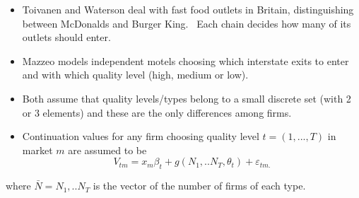 \begin{frame}%


\begin{itemize}
\item Toivanen and Waterson deal with fast food outlets in Britain,
distinguishing between McDonalds and Burger King. \ Each chain decides how
many of its outlets should enter.

\item Mazzeo models independent motels choosing which interstate exits to
enter and with which quality level (high, medium or low).

\item Both assume that quality levels/types belong to a small discrete set
(with 2 or 3 elements) and these are the only differences among firms.

\item Continuation values for any firm choosing quality level $t=(1,...,T)$
in market $m$ are assumed to be 
\begin{equation*}
V_{tm}=x_{m}\beta _{t}+g(N_{1},..N_{T},\theta _{t})+\varepsilon _{tm.}
\end{equation*}
\end{itemize}

where $\bar{N}=N_{1},..N_{T}$ is the vector of the number of firms of each
type.

\end{frame}%

